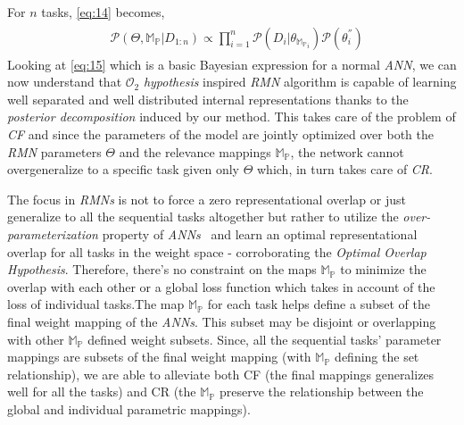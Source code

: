 \documentclass{article}
\begin{document}
For $n$ tasks, \eqref{eq:14} becomes,
\begin{eqnarray}
    \begin{aligned}
    &\mathcal{P}(\Theta, \mathbb{M_P}|D_{1:n}) \propto \prod_{i=1}^n{\mathcal{P}(D_i|\theta_{\mathbb{M_P}_i})\mathcal{P}(\theta_i^{''})} \label{eq:15}
    \end{aligned}
\end{eqnarray}
Looking at \eqref{eq:15} which is a basic Bayesian expression for a normal \textit{ANN}, we can now understand that $\mathcal{O}_2$ \textit{hypothesis} inspired \textit{RMN} algorithm is capable of learning well separated and well distributed internal representations thanks to the \textit{posterior decomposition} induced by our method. This takes care of the problem of \textit{CF} and since the parameters of the model are jointly optimized over both the \textit{RMN} parameters $\Theta$ and the relevance mappings $\mathbb{M_P}$, the network cannot overgeneralize to a specific task given only $\Theta$ which, in turn takes care of \textit{CR}.

The focus in \textit{RMNs} is not to force a zero representational overlap or just generalize to all the sequential tasks altogether but rather to utilize the \textit{over-parameterization} property of \textit{ANNs}~\cite{frankle2019lottery} and learn an optimal representational overlap for all tasks in the weight space - corroborating the \textit{Optimal Overlap Hypothesis}. Therefore, there's no constraint on the maps $\mathbb{M_P}$ to minimize the overlap with each other or a global loss function which takes in account of the loss of individual tasks.The map $\mathbb{M_P}$ for each task helps define a subset of the final weight mapping of the \textit{ANNs}. This subset may be disjoint or overlapping with other $\mathbb{M_P}$ defined weight subsets. Since, all the sequential tasks' parameter mappings are subsets of the final weight mapping (with $\mathbb{M_P}$ defining the set relationship), we are able to alleviate both CF (the final mappings generalizes well for all the tasks) and CR (the $\mathbb{M_P}$ preserve the relationship between the global and individual parametric mappings).


\iffalse
\textbf{The Lottery Ticket Hypothesis and Relevance Mapping}
A question arises as to whether the slight constraints introduced in the weight space by our algorithm worsen the performance of the sequential tasks. The Lottery ticket Hypothesis introduced in a seminal work~\cite{frankle2019lottery} states that - \textit{A randomly-initialized, dense neural network contains a subnet-work that is initialized such that—when trained in isolation—it can match the test accuracy of the original network after training for at most the same number of iterations.} Additionally, our method doesn't remove the previous tasks parameters and subsequent methods can choose to use their predecessors parameters optimally. Therefore, no performance drop is expected in our method and results from our experiments prove the same.
\fi
\end{document}
